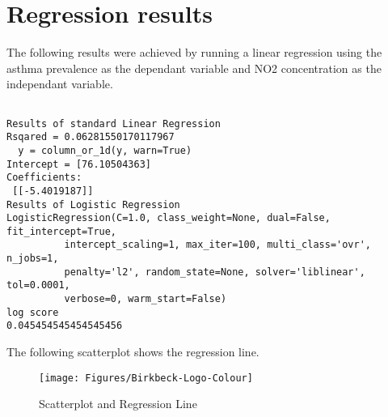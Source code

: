 \section{Regression results}
The following results were achieved by running a linear regression using the asthma prevalence as the dependant variable and NO2 concentration as the independant variable.


\begin{verbatim}

Results of standard Linear Regression
Rsqared = 0.06281550170117967
  y = column_or_1d(y, warn=True)
Intercept = [76.10504363]
Coefficients: 
 [[-5.4019187]]
Results of Logistic Regression
LogisticRegression(C=1.0, class_weight=None, dual=False, fit_intercept=True,
          intercept_scaling=1, max_iter=100, multi_class='ovr', n_jobs=1,
          penalty='l2', random_state=None, solver='liblinear', tol=0.0001,
          verbose=0, warm_start=False)
log score
0.045454545454545456
\end{verbatim}

The following scatterplot shows the regression line.

\begin{figure}
\centering
\texttt{[image: Figures/Birkbeck-Logo-Colour]}
\decoRule
\caption[Scatterplot]{Scatterplot and Regression Line}
\label{fig:Scatterplot}
\end{figure}






